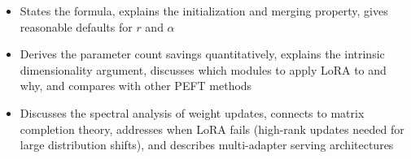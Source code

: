 \begin{interviewq}

\goodgreat
\begin{itemize}
    \item {} States the formula, explains the initialization and merging
          property, gives reasonable defaults for $r$ and $\alpha$
    \item {} Derives the parameter count savings quantitatively, explains
          the intrinsic dimensionality argument, discusses which modules to apply LoRA
          to and why, and compares with other PEFT methods
    \item {} Discusses the spectral analysis of weight updates, connects
          to matrix completion theory, addresses when LoRA fails (high-rank updates
          needed for large distribution shifts), and describes multi-adapter serving
          architectures
\end{itemize}

\end{interviewq}

\bigskip

